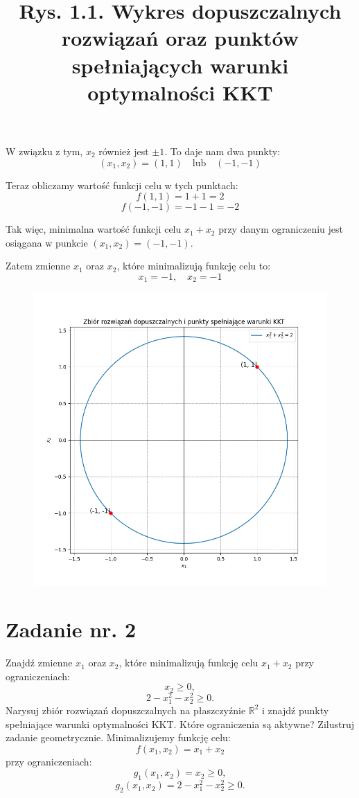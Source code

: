 \documentclass{article}
\begin{document}
W związku z tym, \(x_2\) również jest \( \pm 1 \). To daje nam dwa punkty:
\[ (x_1, x_2) = (1, 1) \quad \text{lub} \quad (-1, -1) \]

Teraz obliczamy wartość funkcji celu w tych punktach:
\[ f(1, 1) = 1 + 1 = 2 \]
\[ f(-1, -1) = -1 - 1 = -2 \]

Tak więc, minimalna wartość funkcji celu \(x_1 + x_2\) przy danym ograniczeniu jest osiągana w punkcie \((x_1, x_2) = (-1, -1)\).

Zatem zmienne \(x_1\) oraz \(x_2\), które minimalizują funkcję celu to:
\[ x_1 = -1, \quad x_2 = -1 \]

\begin{figure}[h]
    \includegraphics[scale=0.4]{zadanie1.png}
    \title{\newline Rys. 1.1. Wykres dopuszczalnych rozwiązań oraz punktów spełniających warunki optymalności KKT}
    \centering
  \end{figure}
\newpage
\section{Zadanie nr. 2}
Znajdź zmienne \(x_1\) oraz \(x_2\), które minimalizują funkcję celu \(x_1 + x_2\) przy ograniczeniach:
\[
x_2 \geq 0,
\]
\[
2 - x_1^2 - x_2^2 \geq 0.
\]
Narysuj zbiór rozwiązań dopuszczalnych na płaszczyźnie \(\mathbb{R}^2\) i znajdź punkty spełniające warunki optymalności KKT. Które ograniczenia są aktywne? Zilustruj zadanie geometrycznie.
Minimalizujemy funkcję celu:
\[
f(x_1, x_2) = x_1 + x_2
\]
przy ograniczeniach:
\[
g_1(x_1, x_2) = x_2 \geq 0,
\]
\[
g_2(x_1, x_2) = 2 - x_1^2 - x_2^2 \geq 0.
\]
\end{document}
